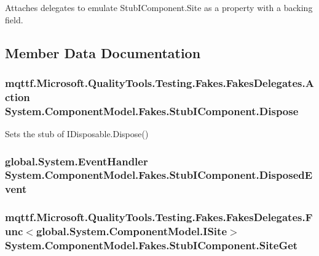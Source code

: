 Attaches delegates to emulate Stub\-I\-Component.\-Site as a property with a backing field.



\subsection{Member Data Documentation}
\hypertarget{class_system_1_1_component_model_1_1_fakes_1_1_stub_i_component_ab7c9d0e4baad0dbfc28bcfef043ae25a}{
\subsubsection[{Dispose}]{\setlength{\rightskip}{0pt plus 5cm}mqttf.\-Microsoft.\-Quality\-Tools.\-Testing.\-Fakes.\-Fakes\-Delegates.\-Action System.\-Component\-Model.\-Fakes.\-Stub\-I\-Component.\-Dispose}}\label{class_system_1_1_component_model_1_1_fakes_1_1_stub_i_component_ab7c9d0e4baad0dbfc28bcfef043ae25a}


Sets the stub of I\-Disposable.\-Dispose()

\hypertarget{class_system_1_1_component_model_1_1_fakes_1_1_stub_i_component_a248455fedc95a17dfa9436e6c5be7e85}{
\subsubsection[{Disposed\-Event}]{\setlength{\rightskip}{0pt plus 5cm}global.\-System.\-Event\-Handler System.\-Component\-Model.\-Fakes.\-Stub\-I\-Component.\-Disposed\-Event}}\label{class_system_1_1_component_model_1_1_fakes_1_1_stub_i_component_a248455fedc95a17dfa9436e6c5be7e85}
\hypertarget{class_system_1_1_component_model_1_1_fakes_1_1_stub_i_component_a54b2688e68cd447b4919ec91b44ee20b}{
\subsubsection[{Site\-Get}]{\setlength{\rightskip}{0pt plus 5cm}mqttf.\-Microsoft.\-Quality\-Tools.\-Testing.\-Fakes.\-Fakes\-Delegates.\-Func$<$global.\-System.\-Component\-Model.\-I\-Site$>$ System.\-Component\-Model.\-Fakes.\-Stub\-I\-Component.\-Site\-Get}}\label{class_system_1_1_component_model_1_1_fakes_1_1_stub_i_component_a54b2688e68cd447b4919ec91b44ee20b}


